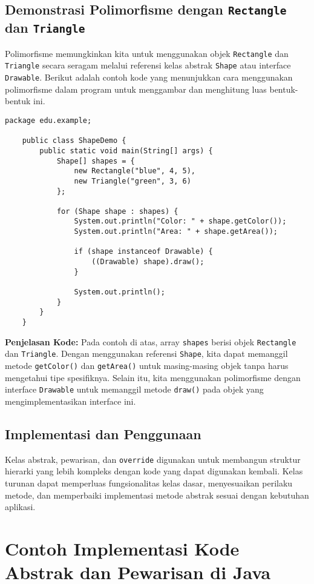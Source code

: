 \subsection{Demonstrasi Polimorfisme dengan \texttt{Rectangle} dan \texttt{Triangle}}

Polimorfisme memungkinkan kita untuk menggunakan objek \texttt{Rectangle} dan \texttt{Triangle} secara seragam melalui referensi kelas abstrak \texttt{Shape} atau interface \texttt{Drawable}. Berikut adalah contoh kode yang menunjukkan cara menggunakan polimorfisme dalam program untuk menggambar dan menghitung luas bentuk-bentuk ini.

\begin{lstlisting}[style=JavaStyle]
	package edu.example;
	
	public class ShapeDemo {
		public static void main(String[] args) {
			Shape[] shapes = {
				new Rectangle("blue", 4, 5),
				new Triangle("green", 3, 6)
			};
			
			for (Shape shape : shapes) {
				System.out.println("Color: " + shape.getColor());
				System.out.println("Area: " + shape.getArea());
				
				if (shape instanceof Drawable) {
					((Drawable) shape).draw();
				}
				
				System.out.println();
			}
		}
	}
\end{lstlisting}

\textbf{Penjelasan Kode:}
Pada contoh di atas, array \texttt{shapes} berisi objek \texttt{Rectangle} dan \texttt{Triangle}. Dengan menggunakan referensi \texttt{Shape}, kita dapat memanggil metode \texttt{getColor()} dan \texttt{getArea()} untuk masing-masing objek tanpa harus mengetahui tipe spesifiknya. Selain itu, kita menggunakan polimorfisme dengan interface \texttt{Drawable} untuk memanggil metode \texttt{draw()} pada objek yang mengimplementasikan interface ini.


\subsection{Implementasi dan Penggunaan}

Kelas abstrak, pewarisan, dan \texttt{override} digunakan untuk membangun struktur hierarki yang lebih kompleks dengan kode yang dapat digunakan kembali. Kelas turunan dapat memperluas fungsionalitas kelas dasar, menyesuaikan perilaku metode, dan memperbaiki implementasi metode abstrak sesuai dengan kebutuhan aplikasi.

\section{Contoh Implementasi Kode Abstrak dan Pewarisan di Java}

